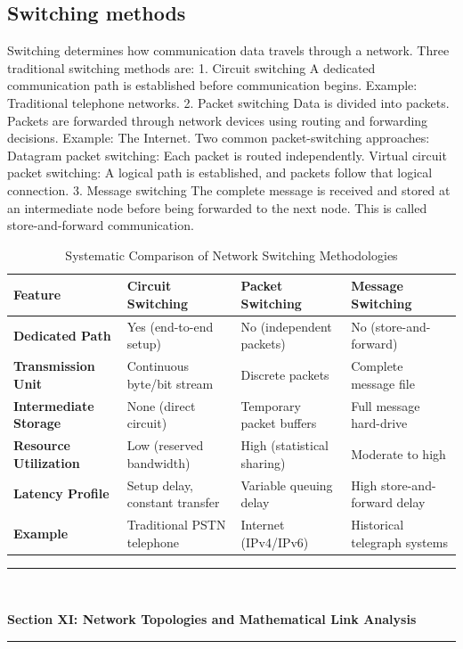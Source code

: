 \subsection{Switching methods}
Switching determines how communication data travels through a network.
Three traditional switching methods are:
1. Circuit switching
A dedicated communication path is established before communication begins.
Example: Traditional telephone networks.
2. Packet switching
Data is divided into packets. Packets are forwarded through network devices using routing and forwarding decisions.
Example: The Internet.
Two common packet-switching approaches:
Datagram packet switching: Each packet is routed independently.
Virtual circuit packet switching: A logical path is established, and packets follow that logical connection.
3. Message switching
The complete message is received and stored at an intermediate node before being forwarded to the next node.
This is called store-and-forward communication.
\begin{table}[htbp]
\centering
\caption{Systematic Comparison of Network Switching Methodologies}
\label{tab:switching_methodologies}
\begin{tabularx}{\textwidth}{p{3.5cm} X X X}
\toprule
\textbf{Feature} & \textbf{Circuit Switching} & \textbf{Packet Switching} & \textbf{Message Switching} \\
\midrule
\textbf{Dedicated Path} & Yes (end-to-end setup) & No (independent packets) & No (store-and-forward) \\
\textbf{Transmission Unit} & Continuous byte/bit stream & Discrete packets & Complete message file \\
\textbf{Intermediate Storage} & None (direct circuit) & Temporary packet buffers & Full message hard-drive \\
\textbf{Resource Utilization} & Low (reserved bandwidth) & High (statistical sharing) & Moderate to high \\
\textbf{Latency Profile} & Setup delay, constant transfer & Variable queuing delay & High store-and-forward delay \\
\textbf{Example} & Traditional PSTN telephone & Internet (IPv4/IPv6) & Historical telegraph systems \\
\bottomrule
\end{tabularx}
\end{table}

\newpage

\newpage
\begin{center}
\vspace{0.5em}
{\color{primary}\rule{0.45\textwidth}{1.2pt}\\[4pt]}
{\Large\bfseries\color{primary} Section XI: Network Topologies and Mathematical Link Analysis\\[2pt]}
{\color{primary}\rule{0.45\textwidth}{1.2pt}}
\vspace{0.5em}
\end{center}

